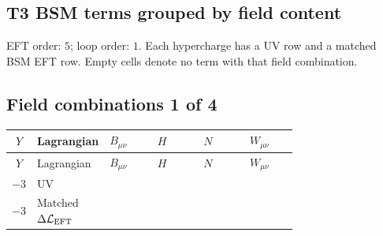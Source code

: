 \documentclass[8pt]{article}
\begin{document}
\begin{landscape}
\section*{T3 BSM terms grouped by field content}
EFT order: $5$; loop order: $1$. 
Each hypercharge has a UV row and a matched BSM EFT row. Empty cells denote no term with that field combination.
\tiny
\subsection*{Field combinations 1 of 4}
\begin{longtable}{@{}c l >{\raggedright\arraybackslash}p{0.18\linewidth} >{\raggedright\arraybackslash}p{0.18\linewidth} >{\raggedright\arraybackslash}p{0.18\linewidth} >{\raggedright\arraybackslash}p{0.18\linewidth}@{}}
\toprule
$Y$ & Lagrangian & $B_{\mu\nu}$ & $H$ & $N$ & $W_{\mu\nu}$ \\
\midrule
\endfirsthead
\toprule
$Y$ & Lagrangian & $B_{\mu\nu}$ & $H$ & $N$ & $W_{\mu\nu}$ \\
\midrule
\endhead
$-3$ & UV &  &  & \scriptsize\adjustbox{max width=\linewidth}{$\begin{gathered} -\frac{1}{2} M_N N_{r_1}{}^T\, C\, N_{r_1}\end{gathered}$} &  \\
\midrule
$-3$ & Matched $\Delta\mathcal{L}_{\rm EFT}$ & \scriptsize\adjustbox{max width=\linewidth}{$\begin{gathered} -\frac{3 \hbar  B_{\mu _1\mu _2}^2}{2 \epsilon }\end{gathered}$} & \scriptsize\adjustbox{max width=\linewidth}{$\begin{gathered} +\frac{\lambda _3^2 \hbar  H_{a_1} H_{a_2} H_{a_1}{}^{\dagger } H_{a_2}{}^{\dagger }}{\epsilon } \\ +\frac{\lambda _4^2 \hbar  H_{a_1} H_{a_2} H_{a_1}{}^{\dagger } H_{a_2}{}^{\dagger }}{2 \epsilon } \\ +\frac{\lambda _3 \lambda _4 \hbar  H_{a_1} H_{a_2} H_{a_1}{}^{\dagger } H_{a_2}{}^{\dagger }}{\epsilon } \\ +C_{\text{H2}} H_{a_1} H_{a_1}{}^{\dagger } \\ -\mu ^2 H_{a_1} H_{a_1}{}^{\dagger }\end{gathered}$} &  & \scriptsize\adjustbox{max width=\linewidth}{$\begin{gathered} -\frac{\hbar  \left(W_{\mu _1\mu _2}^{A_1}\right){}^2}{24 \epsilon }\end{gathered}$} \\

\end{longtable}
\end{landscape}
\end{document}

